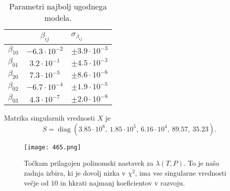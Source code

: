 \documentclass[a4 paper, 12pt]{article}
\newcommand{\diag}{
	\operatorname{diag}
}
\begin{document}
\begin{table}[H]\centering
	\caption{Parametri najbolj ugodnega modela.}
	\begin{tabular}{r|c|l}
		             & $\beta_{ij}$& $\sigma_{\beta_{ij}}$ \\
		\hline
		$\beta_{10}$ & $-6.3 \cdot 10^{-2}$ & $\pm 3.9 \cdot 10^{-3}$ \\
		$\beta_{01}$ & $3.2 \cdot 10^{-1}$  & $\pm 4.5 \cdot 10^{-3}$ \\
		$\beta_{20}$ & $7.3 \cdot 10^{-5}$  & $\pm 8.6 \cdot 10^{-6}$ \\
		$\beta_{02}$ & $-6.7 \cdot 10^{-4}$ & $\pm 1.9 \cdot 10^{-5}$ \\
		$\beta_{03}$ & $4.3 \cdot 10^{-7}$  & $\pm 2.0 \cdot 10^{-8}$
	\end{tabular}
	\label{tab3}
\end{table}
Matrika singularnih vrednosti $X$ je
\begin{equation}
	S = \diag(3.85 \cdot 10^8,\ 1.85 \cdot 10^5,\ 6.16 \cdot 10^4,\ 89.57,\ 35.23).
\end{equation}

\begin{figure}[H]\centering
	\texttt{[image: 465.png]}
	\caption{To\v ckam prilagojen polinomski nastavek za $\lambda (T, P)$. To je na\v sa zadnja izbira, ki je dovolj
		nizka v $\overline{\chi^2}$, ima vse singularne vrednosti ve\v cje od $10$ in hkrati najmanj koeficientov
		v razvoju.}
	\label{zmaga}
\end{figure}
\end{document}
